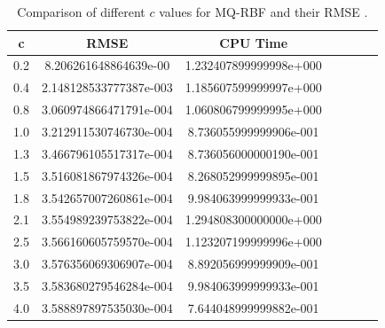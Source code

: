 \documentclass[12pt]{article}
\numberwithin{equation}{section} %
\begin{document}
\newpage
\begin{table}[h]
\centering
\begin{tabular}{|c|c|c|c|c|c|c|}
  \hline
  c &  RMSE & CPU Time \\
  \hline

0.2 & 8.206261648864639e-00 & 1.232407899999998e+000  \\
  0.4 & 2.148128533777387e-003  &1.185607599999997e+000   \\
  0.8 & 3.060974866471791e-004  &1.060806799999995e+000 \\
  1.0 & 3.212911530746730e-004 &8.736055999999906e-001\\
  1.3 & 3.466796105517317e-004 & 8.736056000000190e-001 \\
  1.5 &3.516081867974326e-004  & 8.268052999999895e-001 \\
  1.8 &3.542657007260861e-004   &9.984063999999933e-001   \\
  2.1 & 3.554989239753822e-004  & 1.294808300000000e+000 \\
  2.5&3.566160605759570e-004 &1.123207199999996e+000\\
  3.0&3.576356069306907e-004 & 8.892056999999909e-001\\
  3.5&3.583680279546284e-004 &9.984063999999933e-001\\
  4.0& 3.588897897535030e-004&7.644048999999882e-001\\
  \hline

  \hline

\end{tabular}
  \caption{Comparison of different $c$ values for MQ-RBF and their RMSE .}\label{Tab_1DFinal}
\end{table}
\end{document}
